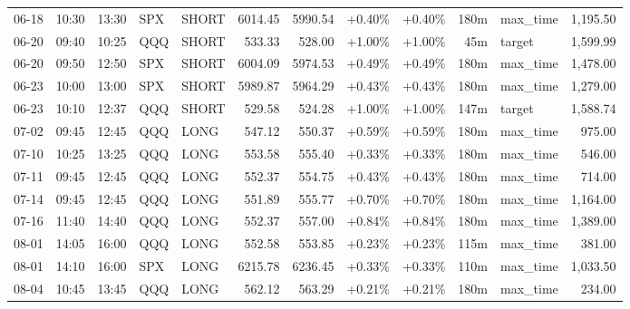 \documentclass[11pt,a4paper]{article}
\begin{document}
\begin{center}
\begin{longtable}{>{\color{txtmain}}l l l l l r r r r r >{\color{txtmain}}l r}
06-18 & 10:30 & 13:30 & SPX & SHORT & 6014.45 & 5990.54 & \textcolor{wingreen}{+0.40\%} & \textcolor{wingreen}{+0.40\%} & 180m & max\_time & \textcolor{wingreen}{1,195.50} \\
06-20 & 09:40 & 10:25 & QQQ & SHORT & 533.33 & 528.00 & \textcolor{wingreen}{+1.00\%} & \textcolor{wingreen}{+1.00\%} & 45m & target & \textcolor{wingreen}{1,599.99} \\
06-20 & 09:50 & 12:50 & SPX & SHORT & 6004.09 & 5974.53 & \textcolor{wingreen}{+0.49\%} & \textcolor{wingreen}{+0.49\%} & 180m & max\_time & \textcolor{wingreen}{1,478.00} \\
06-23 & 10:00 & 13:00 & SPX & SHORT & 5989.87 & 5964.29 & \textcolor{wingreen}{+0.43\%} & \textcolor{wingreen}{+0.43\%} & 180m & max\_time & \textcolor{wingreen}{1,279.00} \\
06-23 & 10:10 & 12:37 & QQQ & SHORT & 529.58 & 524.28 & \textcolor{wingreen}{+1.00\%} & \textcolor{wingreen}{+1.00\%} & 147m & target & \textcolor{wingreen}{1,588.74} \\
07-02 & 09:45 & 12:45 & QQQ & LONG & 547.12 & 550.37 & \textcolor{wingreen}{+0.59\%} & \textcolor{wingreen}{+0.59\%} & 180m & max\_time & \textcolor{wingreen}{975.00} \\
07-10 & 10:25 & 13:25 & QQQ & LONG & 553.58 & 555.40 & \textcolor{wingreen}{+0.33\%} & \textcolor{wingreen}{+0.33\%} & 180m & max\_time & \textcolor{wingreen}{546.00} \\
07-11 & 09:45 & 12:45 & QQQ & LONG & 552.37 & 554.75 & \textcolor{wingreen}{+0.43\%} & \textcolor{wingreen}{+0.43\%} & 180m & max\_time & \textcolor{wingreen}{714.00} \\
07-14 & 09:45 & 12:45 & QQQ & LONG & 551.89 & 555.77 & \textcolor{wingreen}{+0.70\%} & \textcolor{wingreen}{+0.70\%} & 180m & max\_time & \textcolor{wingreen}{1,164.00} \\
07-16 & 11:40 & 14:40 & QQQ & LONG & 552.37 & 557.00 & \textcolor{wingreen}{+0.84\%} & \textcolor{wingreen}{+0.84\%} & 180m & max\_time & \textcolor{wingreen}{1,389.00} \\
08-01 & 14:05 & 16:00 & QQQ & LONG & 552.58 & 553.85 & \textcolor{wingreen}{+0.23\%} & \textcolor{wingreen}{+0.23\%} & 115m & max\_time & \textcolor{wingreen}{381.00} \\
08-01 & 14:10 & 16:00 & SPX & LONG & 6215.78 & 6236.45 & \textcolor{wingreen}{+0.33\%} & \textcolor{wingreen}{+0.33\%} & 110m & max\_time & \textcolor{wingreen}{1,033.50} \\
08-04 & 10:45 & 13:45 & QQQ & LONG & 562.12 & 563.29 & \textcolor{wingreen}{+0.21\%} & \textcolor{wingreen}{+0.21\%} & 180m & max\_time & \textcolor{wingreen}{234.00} \\

\end{longtable}
\end{center}
\end{document}

